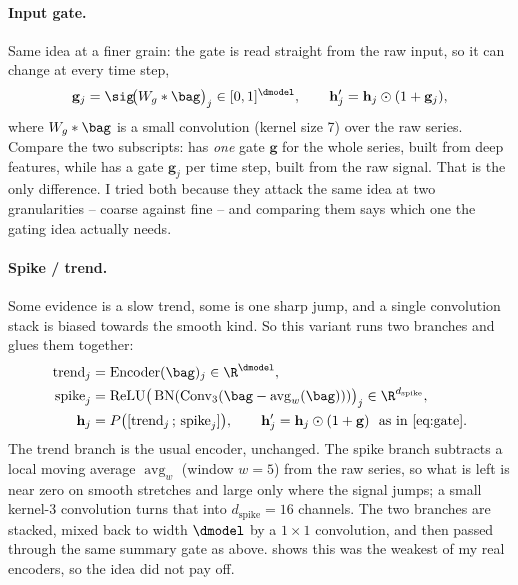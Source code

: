 \paragraph{Input gate.}
Same idea at a finer grain: the gate is read straight from the raw input, so it can change at every
time step,
\begin{equation}
  \mathbf{g}_j = \sig\!\big(W_g \ast \bag\big)_j \in [0,1]^{\dmodel},
  \qquad
  \mathbf{h}'_j = \mathbf{h}_j \odot (1 + \mathbf{g}_j) ,
  \label{eq:input_gate}
\end{equation}
where $W_g \ast \bag$ is a small convolution (kernel size 7) over the raw series. Compare the two
subscripts:  has \emph{one} gate $\mathbf{g}$ for the whole series, built from deep
features, while  has a gate $\mathbf{g}_j$ per time step, built from the raw
signal. That is the only difference. I tried both because they attack the same idea at two
granularities -- coarse against fine -- and comparing them says which one the gating idea actually
needs.

\paragraph{Spike / trend.}
Some evidence is a slow trend, some is one sharp jump, and a single convolution stack is biased
towards the smooth kind. So this variant runs two branches and glues them together:
\begin{align}
  \text{trend}_j &= \text{Encoder}(\bag)_j \in \R^{\dmodel} ,
  \label{eq:spike_trend}\\
  \text{spike}_j &= \operatorname{ReLU}\!\big(\operatorname{BN}(\operatorname{Conv}_3(
  \bag - \operatorname{avg}_w(\bag)))\big)_j \in \R^{d_{\text{spike}}} ,
  \label{eq:spike_branch}\\
  \mathbf{h}_j &= P\big([\text{trend}_j \,;\, \text{spike}_j]\big),
  \qquad
  \mathbf{h}'_j = \mathbf{h}_j \odot (1 + \mathbf{g}) \ \text{ as in \Cref{eq:gate}} .
  \label{eq:spike_mix}
\end{align}
The trend branch is the usual encoder, unchanged. The spike branch subtracts a local moving average
$\operatorname{avg}_w$ (window $w = 5$) from the raw series, so what is left is near zero on smooth
stretches and large only where the signal jumps; a small kernel-3 convolution turns that into
$d_{\text{spike}} = 16$ channels. The two branches are stacked, mixed back to width $\dmodel$ by a
$1\times1$ convolution, and then passed through the same summary gate as above.
 shows this was the weakest of my real encoders, so the idea did not pay
off.

